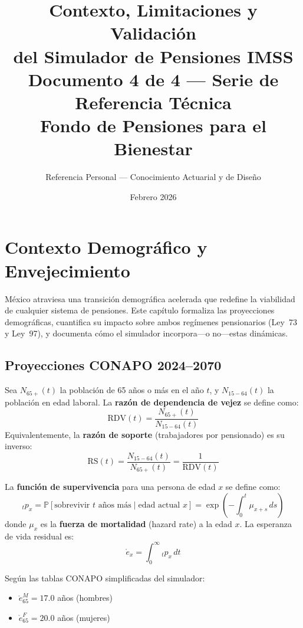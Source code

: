 \documentclass[11pt,a4paper]{report}
\title{
  \vspace{2cm}
  {\Huge\bfseries Contexto, Limitaciones y Validaci\'on} \\[0.5cm]
  {\LARGE\bfseries del Simulador de Pensiones IMSS} \\[1cm]
  {\Large Documento 4 de 4 --- Serie de Referencia T\'ecnica} \\[2cm]
  {\large Fondo de Pensiones para el Bienestar}
}
\author{Referencia Personal --- Conocimiento Actuarial y de Dise\~no}
\date{Febrero 2026}
\begin{document}
\maketitle
\tableofcontents
\newpage


\chapter{Contexto Demogr\'afico y Envejecimiento}

M\'exico atraviesa una transici\'on demogr\'afica acelerada que redefine la viabilidad de cualquier sistema de pensiones. Este cap\'itulo formaliza las proyecciones demogr\'aficas, cuantifica su impacto sobre ambos reg\'imenes pensionarios (Ley~73 y Ley~97), y documenta c\'omo el simulador incorpora---o no---estas din\'amicas.

\section{Proyecciones CONAPO 2024--2070}

\begin{tcolorbox}[colback=blue!5!white, colframe=blue!75!black, title=\textbf{Definici\'on Formal: Raz\'on de Dependencia y Funci\'on de Supervivencia}]
Sea $N_{65+}(t)$ la poblaci\'on de 65 a\~nos o m\'as en el a\~no $t$, y $N_{15-64}(t)$ la poblaci\'on en edad laboral. La \textbf{raz\'on de dependencia de vejez} se define como:
\[
  \text{RDV}(t) = \frac{N_{65+}(t)}{N_{15-64}(t)}
\]
Equivalentemente, la \textbf{raz\'on de soporte} (trabajadores por pensionado) es su inverso:
\[
  \text{RS}(t) = \frac{N_{15-64}(t)}{N_{65+}(t)} = \frac{1}{\text{RDV}(t)}
\]

La \textbf{funci\'on de supervivencia} para una persona de edad $x$ se define como:
\[
  {}_tp_x = \mathbb{P}[\text{sobrevivir } t \text{ a\~nos m\'as} \mid \text{edad actual } x] = \exp\left(-\int_0^t \mu_{x+s}\, ds\right)
\]
donde $\mu_x$ es la \textbf{fuerza de mortalidad} (hazard rate) a la edad $x$. La esperanza de vida residual es:
\[
  \mathring{e}_x = \int_0^\infty {}_tp_x \, dt
\]

Seg\'un las tablas CONAPO simplificadas del simulador:
\begin{itemize}
  \item $\mathring{e}_{65}^M = 17.0$ a\~nos (hombres)
  \item $\mathring{e}_{65}^F = 20.0$ a\~nos (mujeres)
\end{itemize}
\end{tcolorbox}
\end{document}
